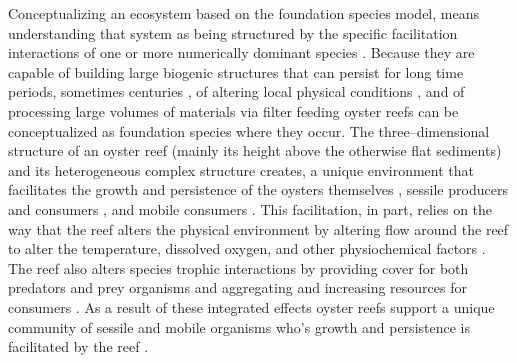 \documentclass{article}
\begin{document}
Conceptualizing an ecosystem based on the foundation species model, means understanding that system as being structured by the specific facilitation interactions of one or more numerically dominant species \cite{dayton_toward_1972, ellison_loss_2005, angelini_interactions_2011}. Because they are capable of building large biogenic structures that can persist for long time periods, sometimes centuries \cite{lockwood_conservation_2019}, of altering local physical conditions \cite{lenihan_physicalbiological_1999}, and of processing large volumes of materials via filter feeding \cite{newell_ecological_1988} oyster reefs can be conceptualized as foundation species where they occur. The three--dimensional structure of an oyster reef (mainly its height above the otherwise flat sediments) and its heterogeneous complex structure creates, a unique environment that facilitates the growth and persistence of the oysters themselves \cite{lenihan_physicalbiological_1999}, sessile producers and consumers \cite{}, and mobile consumers \cite{smith_restored_2022, searles_oyster_2022}. This facilitation, in part, relies on the way that the reef alters the physical environment by altering flow around the reef to alter the temperature, dissolved oxygen, and other physiochemical factors \cite{lenihan_physicalbiological_1999}. The reef also alters species trophic interactions by providing cover for both predators and prey organisms \cite{smith_restored_2022} and aggregating and increasing resources for consumers \cite{newell_ecological_1988}. As a result of these integrated effects oyster reefs support a unique community of sessile and mobile organisms who's growth and persistence is facilitated by the reef \cite{lenihan_physicalbiological_1999, smith_restored_2022}. 
\end{document}
